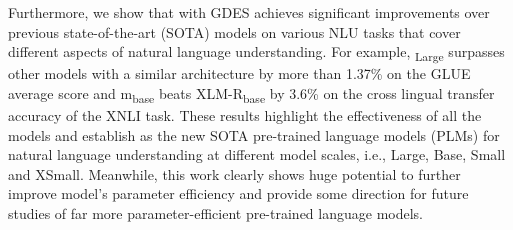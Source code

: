 Furthermore, we show that {\ModelName} with GDES achieves significant improvements over previous state-of-the-art (SOTA) models on various NLU tasks that cover different aspects of natural language understanding. For example, {\ModelName}\textsubscript{Large} surpasses other models with a similar architecture by more than 1.37\% on the GLUE average score and m{\ModelName}\textsubscript{base} beats XLM-R\textsubscript{base} by 3.6\% on the cross lingual transfer accuracy of the XNLI task. These results highlight the effectiveness of all the {\ModelName} models and establish {\ModelName} as the new SOTA pre-trained language models (PLMs) for natural language understanding at different model scales, i.e., Large, Base, Small and XSmall.  Meanwhile, this work clearly shows huge potential to further improve model's parameter efficiency and provide some direction for future studies of far more parameter-efficient pre-trained language models. 


